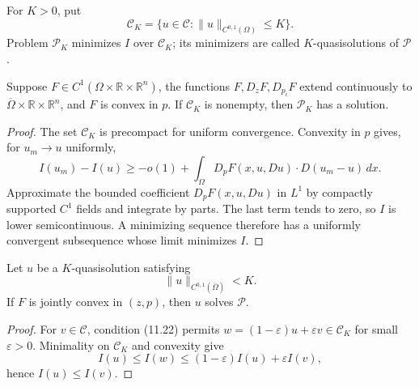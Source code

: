 For $K>0$, put
\[
\mathcal C_K=\{u\in\mathcal C:\|u\|_{C^{0,1}(\Omega)}\leq K\}.
\]
Problem $\mathcal P_K$ minimizes $I$ over $\mathcal C_K$; its minimizers are
called $K$-quasisolutions of $\mathcal P$.

\begin{theorem}
\label{gt-thm-11-10}
Suppose $F\in C^1(\Omega\times\mathbb R\times\mathbb R^n)$, the functions
$F,D_zF,D_{p_i}F$ extend continuously to
$\overline\Omega\times\mathbb R\times\mathbb R^n$, and $F$ is convex in
$p$. If $\mathcal C_K$ is nonempty, then $\mathcal P_K$ has a solution.
\end{theorem}
\begin{proof}
\sketch The set $\mathcal C_K$ is precompact for uniform convergence.
Convexity in $p$ gives, for $u_m\to u$ uniformly,
\[
I(u_m)-I(u)\geq-o(1)+
\int_\Omega D_pF(x,u,Du)\mathbin{\cdot}D(u_m-u)\,dx.
\]
Approximate the bounded coefficient $D_pF(x,u,Du)$ in $L^1$ by compactly
supported $C^1$ fields and integrate by parts. The last term tends to zero,
so $I$ is lower semicontinuous. A minimizing sequence therefore has a
uniformly convergent subsequence whose limit minimizes $I$.
\end{proof}

\begin{theorem}
\label{gt-thm-11-11}
Let $u$ be a $K$-quasisolution satisfying
\begin{equation}
\tag{11.22}
\|u\|_{C^{0,1}(\overline\Omega)}<K.
\end{equation}
If $F$ is jointly convex in $(z,p)$, then $u$ solves $\mathcal P$.
\end{theorem}
\begin{proof}
\sketch For $v\in\mathcal C$, condition (11.22) permits
$w=(1-\varepsilon)u+\varepsilon v\in\mathcal C_K$ for small
$\varepsilon>0$. Minimality on $\mathcal C_K$ and convexity give
\[
I(u)\leq I(w)\leq(1-\varepsilon)I(u)+\varepsilon I(v),
\]
hence $I(u)\leq I(v)$.
\end{proof}
